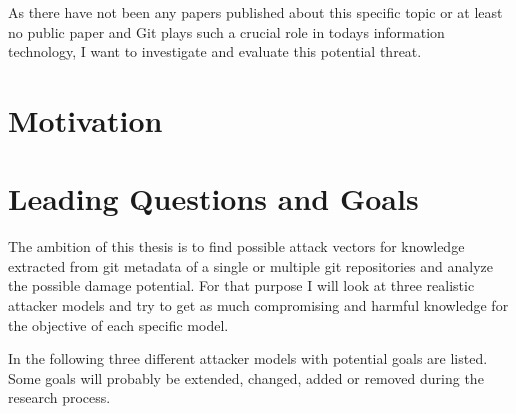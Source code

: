 As there have not been any papers published about this specific topic or at least no public paper and Git plays such a crucial role in todays information technology, I want to investigate and evaluate this potential threat.

\section{Motivation}

\section{Leading Questions and Goals}

The ambition of this thesis is to find possible attack vectors for knowledge extracted from git metadata of a single or multiple git repositories and analyze the possible damage potential.
For that purpose I will look at three realistic attacker models and try to get as much compromising and harmful knowledge for the objective of each specific model.

In the following three different attacker models with potential goals are listed.
Some goals will probably be extended, changed, added or removed during the research process.

